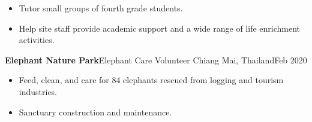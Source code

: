 \documentclass[letterpaper,10pt]{article}
\begin{document}
\begin{itemize}
    \item Tutor small groups of fourth grade students.
    \item Help site staff provide academic support and a wide range of life enrichment activities.
\end{itemize}

\vspace{1pc}
\textbf{Elephant Nature Park}\hfill Elephant Care Volunteer
\smallbreak Chiang Mai, Thailand\hfill Feb 2020

\begin{itemize}
    \item Feed, clean, and care for 84 elephants rescued from logging and tourism industries.
    \item Sanctuary construction and maintenance.
\end{itemize}
\end{document}
